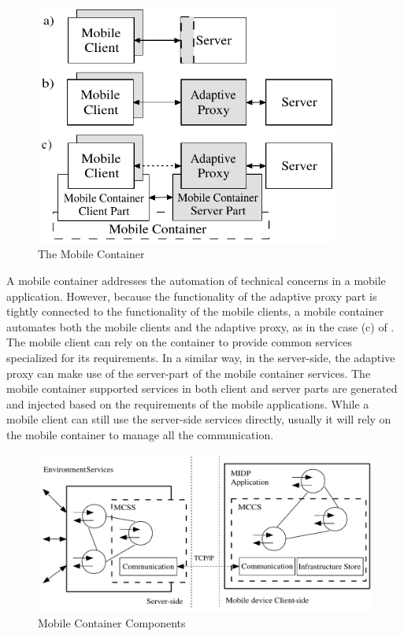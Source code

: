 \begin{figure}[ht]
	\begin{center}
		\includegraphics[width=10cm,height=!]{ch05/mc}
	\end{center}
	\caption{The Mobile Container}
	\label{fig:mob-con-arch}
\end{figure}

A mobile container addresses the automation of technical concerns in a mobile application. However, because the functionality of the adaptive proxy part is tightly connected to the functionality of the mobile clients, a mobile container automates both the mobile clients and the adaptive proxy, as in the case (c) of . The mobile client can rely on the container to provide common services specialized for its requirements. In a similar way, in the server-side, the adaptive proxy can make use of the server-part of the mobile container services. The mobile container supported services in both client and server parts are generated and injected based on the requirements of the mobile applications. While a mobile client can still use the server-side services directly, usually it will rely on the mobile container to manage all the communication.

\begin{figure}[ht]
	\begin{center}
		\includegraphics[width=15cm,height=!]{ch05/mobcon}
	\end{center}
	\caption{Mobile Container Components}
	\label{fig:mob-container}
\end{figure}

